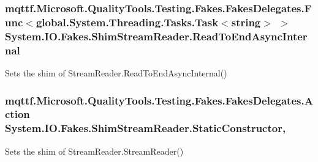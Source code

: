 \hypertarget{class_system_1_1_i_o_1_1_fakes_1_1_shim_stream_reader_ab911284aaf5a8e094e1e177624399757}{
\subsubsection[{Read\-To\-End\-Async\-Internal}]{\setlength{\rightskip}{0pt plus 5cm}mqttf.\-Microsoft.\-Quality\-Tools.\-Testing.\-Fakes.\-Fakes\-Delegates.\-Func$<$global.\-System.\-Threading.\-Tasks.\-Task$<$string$>$ $>$ System.\-I\-O.\-Fakes.\-Shim\-Stream\-Reader.\-Read\-To\-End\-Async\-Internal\hspace{0.3cm}{\ttfamily [set]}}}\label{class_system_1_1_i_o_1_1_fakes_1_1_shim_stream_reader_ab911284aaf5a8e094e1e177624399757}


Sets the shim of Stream\-Reader.\-Read\-To\-End\-Async\-Internal()

\hypertarget{class_system_1_1_i_o_1_1_fakes_1_1_shim_stream_reader_ae26a21fd06bfb2a3753f5dc3cea418d7}{
\subsubsection[{Static\-Constructor}]{\setlength{\rightskip}{0pt plus 5cm}mqttf.\-Microsoft.\-Quality\-Tools.\-Testing.\-Fakes.\-Fakes\-Delegates.\-Action System.\-I\-O.\-Fakes.\-Shim\-Stream\-Reader.\-Static\-Constructor\hspace{0.3cm}{\ttfamily [static]}, {\ttfamily [set]}}}\label{class_system_1_1_i_o_1_1_fakes_1_1_shim_stream_reader_ae26a21fd06bfb2a3753f5dc3cea418d7}


Sets the shim of Stream\-Reader.\-Stream\-Reader()

